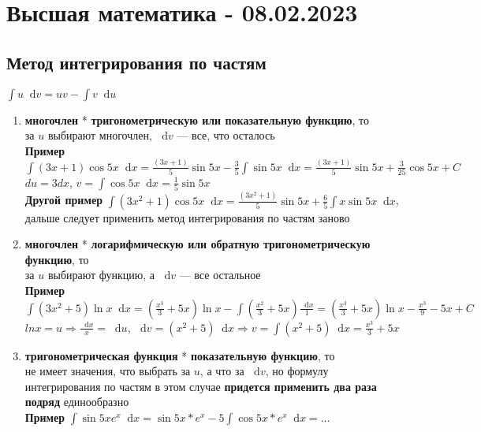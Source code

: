 \documentclass{article}
\newcommand*\diff{\mathop{}\!\mathrm{d}}
\begin{document}
\section{Высшая математика - 08.02.2023}

\subsection{Метод интегрирования по частям}

$\int u \diff v = u v - \int v \diff u$

\begin{enumerate}
    \item \textbf{многочлен} * \textbf{тригонометрическую или показательную функцию}, то \\
    за $u$ выбирают многочлен, $\diff v$ — все, что осталось \\
    \textbf{Пример} $\int (3 x + 1) \cos 5 x \diff x = \frac{(3x + 1)}{5} \sin 5 x - \frac{3}{5} \int \sin 5 x \diff x = \frac{(3 x + 1)}{5} \sin 5 x + \frac{3}{25} \cos 5 x + C$ \\
    $du = 3 d x$, $v = \int \cos 5 x \diff x = \frac{1}{5} \sin 5x$ \\
    \textbf{Другой пример} $\int (3 x^2 + 1) \cos 5 x \diff x = \frac{(3 x^2 + 1)}{5} \sin 5 x + \frac{6}{5} \int x \sin 5 x \diff x$, дальше следует применить метод интегрирования по частям заново
    \item \textbf{многочлен} * \textbf{логарифмическую или обратную тригонометрическую функцию}, то \\
    за $u$ выбирают функцию, а $\diff v$ — все остальное \\
    \textbf{Пример} $\int (3x^2 + 5) \ln x \diff x = (\frac{x^3}{3} + 5 x) \ln x - \int (\frac{x^2}{3} + 5 x) \frac{\diff x}{1} = (\frac{x^3}{3} + 5x) \ln x - \frac{x^3}{9} - 5 x + C$ \\
    $ln x = u \Longrightarrow \frac{\diff x}{x} = \diff u$, $\diff v = (x^2 + 5) \diff x \Longrightarrow v = \int (x^2 + 5) \diff x = \frac{x^3}{3} + 5 x$
    \item \textbf{тригонометрическая функция} * \textbf{показательную функцию}, то \\
    не имеет значения, что выбрать за $u$, а что за $\diff v$, но формулу интегрирования по частям в этом случае \textbf{придется применить два раза подряд} единообразно \\
    \textbf{Пример} $\int \sin 5x e^{x} \diff x = \sin 5 x * e^{x} - 5 \int \cos 5 x * e^{x} \diff x = \dots$ \\

\end{enumerate}
\end{document}
